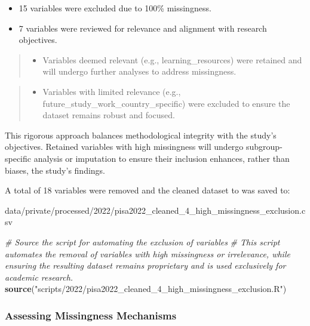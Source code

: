 \documentclass[
]{article}
\newenvironment{Shaded}{\begin{snugshade}}{\end{snugshade}}
\newcommand{\CommentTok}[1]{\textcolor[rgb]{0.56,0.35,0.01}{\textit{#1}}}
\newcommand{\FunctionTok}[1]{\textcolor[rgb]{0.13,0.29,0.53}{\textbf{#1}}}
\newcommand{\NormalTok}[1]{#1}
\newcommand{\StringTok}[1]{\textcolor[rgb]{0.31,0.60,0.02}{#1}}
\providecommand{\tightlist}{%
  \setlength{\itemsep}{0pt}\setlength{\parskip}{0pt}}
\begin{document}
\begin{itemize}
\item
  15 variables were excluded due to 100\% missingness.
\item
  7 variables were reviewed for relevance and alignment with research
  objectives.
\end{itemize}

\begin{quote}
\begin{itemize}
\tightlist
\item
  Variables deemed relevant (e.g., learning\_resources) were retained
  and will undergo further analyses to address missingness.
\end{itemize}
\end{quote}

\begin{quote}
\begin{itemize}
\tightlist
\item
  Variables with limited relevance (e.g.,
  future\_study\_work\_country\_specific) were excluded to ensure the
  dataset remains robust and focused.
\end{itemize}
\end{quote}

This rigorous approach balances methodological integrity with the
study's objectives. Retained variables with high missingness will
undergo subgroup-specific analysis or imputation to ensure their
inclusion enhances, rather than biases, the study's findings.

A total of 18 variables were removed and the cleaned dataset to was
saved to:

data/private/processed/2022/pisa2022\_cleaned\_4\_high\_missingness\_exclusion.csv

\begin{Shaded}
\begin{Highlighting}[]
\CommentTok{\# Source the script for automating the exclusion of variables}
\CommentTok{\# This script automates the removal of variables with high missingness or irrelevance, while ensuring the resulting dataset remains proprietary and is used exclusively for academic research.}
\FunctionTok{source}\NormalTok{(}\StringTok{"scripts/2022/pisa2022\_cleaned\_4\_high\_missingness\_exclusion.R"}\NormalTok{)}
\end{Highlighting}
\end{Shaded}

\hypertarget{assessing-missingness-mechanisms}{%
\subsubsection{Assessing Missingness
Mechanisms}\label{assessing-missingness-mechanisms}}
\end{document}
